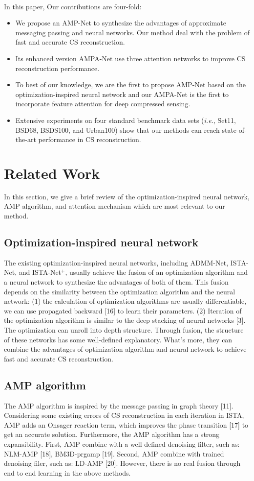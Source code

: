 \documentclass[conference]{IEEEtran}
\begin{document}
\\In this paper, Our contributions are four-fold: 
\begin{itemize}
\item We propose an AMP-Net to synthesize the advantages of approximate messaging passing and neural networks. Our method deal with the problem of fast and accurate CS reconstruction.
\item Its enhanced version AMPA-Net use three attention networks to improve CS reconstruction performance.
\item To best of our knowledge, we are the first to propose AMP-Net based on the optimization-inspired neural network and our AMPA-Net is the first to incorporate feature attention for deep compressed sensing.
\item Extensive experiments on four standard benchmark data sets (\textit{i.e.}, Set11, BSD68, BSDS100, and Urban100) show that our methods can reach state-of-the-art performance in CS reconstruction.
\end{itemize}
\section{Related Work}
In this section, we give a brief review of the optimization-inspired neural network, AMP algorithm, and attention mechanism which are most relevant to our method.
\subsection{Optimization-inspired neural network}
The existing optimization-inspired neural networks, including ADMM-Net, ISTA-Net, and ISTA-Net$^{+}$, usually achieve the fusion of an optimization algorithm and a neural network to synthesize the advantages of both of them. This fusion depends on the similarity between the optimization algorithm and the neural network: (1) the calculation of optimization algorithms are usually differentiable, we can use propagated backward [16] to learn their parameters. (2) Iteration of the optimization algorithm is similar to the deep stacking of neural networks [3]. The optimization can unroll into depth structure.
Through fusion, the structure of these networks has some well-defined explanatory. What's more, they can combine the advantages of optimization algorithm and neural network to achieve fast and accurate CS reconstruction.
\subsection{AMP algorithm}
The AMP algorithm is inspired by the message passing in graph theory [11]. Considering some existing errors of CS reconstruction in each iteration in ISTA, AMP adds an Onsager reaction term, which improves the phase transition [17] to get an accurate solution. Furthermore, the AMP algorithm has a strong expansibility. First, AMP combine with a well-defined denoising filter, such as: NLM-AMP [18], BM3D-prgamp [19]. Second, AMP combine with trained denoising filer, such as: LD-AMP [20]. However, there is no real fusion through end to end learning in the above methods.
\end{document}
